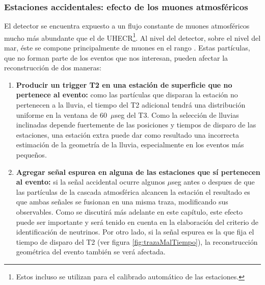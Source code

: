 		\subsubsection{Estaciones accidentales: efecto de los muones atmosféricos}
		
		El detector se encuentra expuesto a un flujo constante de muones atmosféricos mucho más abundante que el de UHECR\footnote{Estos incluso se utilizan para el calibrado automático de las estaciones.}. 
		Al nivel del detector,  sobre el nivel del mar, éste se compone principalmente de muones en el rango . 
		Estas partículas, que no forman parte de los eventos que nos interesan, pueden afectar la reconstrucción de dos maneras:
		\begin{enumerate}
		\item \textbf{Producir un trigger T2 en una estación de superficie que no pertenece al evento:} como las partículas que disparan la estación no pertenecen a la lluvia, el tiempo del T2 adicional tendrá una distribución uniforme en la ventana de 60~$\mu$seg del T3. Como la selección de lluvias inclinadas depende fuertemente de las posiciones y tiempos de disparo de las estaciones, una estación extra puede dar como resultado una incorrecta estimación de la geometría de la lluvia, especialmente en los eventos más pequeños.

		\item \textbf{Agregar señal espurea en alguna de las estaciones que sí pertenecen al evento:} si la señal accidental ocurre algunos $\mu$seg antes o despues de que las partículas de la cascada atmosférica alcancen la estación el resultado es que ambas señales se fusionan en una misma traza, modificando sus observables.
		Como se discutirá más adelante en este capítulo, este efecto puede ser importante y será tenido en cuenta en la elaboración del criterio de identificación de neutrinos. 
		Por otro lado, si la señal espurea es la que fija el tiempo de disparo del T2 (ver figura \ref{fig:trazaMalTiempo}), la reconstrucción geométrica del evento también se verá afectada.
		\end{enumerate}
